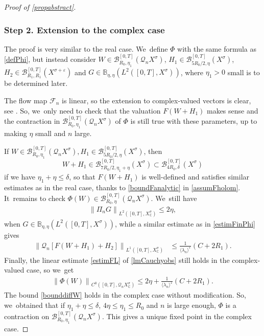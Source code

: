 \documentclass[JEP,XML,SOM,Unicode,published]{cedram}
\theoremstyle{definition}
\let\mc\mathcal
\let\veps\varepsilon
\newcommand{\B}{\mc{B}}
\newcommand{\Q}{\mathcal{Q}}
\providecommand{\inn}[1]{\langle#1\rangle}
\newcommand\nor[2]{\left\|#1\right\|_{#2}}
\newcommand\FL{\mathcal{F}_{n}}
\begin{document}
\begin{proof}[Proof of \cref{propabstract}]
\subsubsection*{Step 2. Extension to the complex case} The proof is very similar to the real case. We~define $\Phi$ with the same formula as \eqref{defPhi}, but instead consider $W\in \B_{R_{0},\eta_{1}}^{[0,T]}(\Q_n X^{\sigma})$, $H_{1}\in \B_{5R_{0}/2,\eta}^{[0,T]}(X^{\sigma})$, $H_{2}\in \B_{R_{1}, R_{1}}^{[0,T]}(X^{\sigma+\veps})$ and $G\in \mathbb{B}_{\eta,\eta}(L^{2}([0,T],X^{\sigma}))$, where $\eta_{1}>0$ small is to be determined later.

The flow map $\FL$ is linear, so the extension to complex-valued vectors is clear, see \cite[Th.\,3]{BS:71-polynomials}. So, we~only need to check that the valuation $F(W+H_{1})$ makes sense and the contraction in $\B_{R_{0},\eta_{1}}^{[0,T]}(\Q_n X^{\sigma})$ of $\Phi$ is still true with these parameters, up to making $\eta$ small and $n$ large.

If $W\in \B_{R_{0},\eta_{1}}^{[0,T]}(\Q_n X^{\sigma}), H_{1}\in \B_{5R_{0}/2,\eta}^{[0,T]}(X^{\sigma})$, then
\[
W+H_{1}\in \B_{7R_{0}/2,\eta_{1}+\eta}^{[0,T]}(X^{\sigma})\subset \B_{4R_{0},\delta}^{[0,T]}(X^{\sigma})
\]
if we have $\eta_{1}+\eta\leq \delta$, so that $F(W+H_{1})$ is well-defined and satisfies similar estimates as in the real case, thanks to \eqref{boundFanalytic} in \cref{assumFholom}. It~remains to check $\Phi(W)\in \B_{R_{0},\eta}^{[0,T]}(\Q_n X^{\sigma})$. We~still have
\begin{align*}
\nor{\Pi_{n}G}{L^{2}([0,T],X_\mathbb{C}^{\sigma})}\leq 2\eta,
\end{align*}
when $G\in \mathbb{B}_{\eta,\eta}(L^{2}([0,T],X^{\sigma}))$, while a similar estimate as in \eqref{estimFinPhi} gives
\begin{align*}
\nor{\Q_{n}\left[ F(W+H_{1})+H_{2}\right]}{L^{1}([0,T],X_\mathbb{C}^{\sigma})}&\leq \frac{1}{\inn{\lambda_n}^{\veps}} \left(C+2R_{1}\right).
\end{align*}
Finally, the linear estimate \eqref{estimFL} of \cref{lmCauchyobs} still holds in the complex-valued case, so we~get
\begin{align*}
\nor{\Phi(W)}{C^{0}([0,T],\Q_{n}X_\mathbb{C}^{\sigma})}\leq 2\eta+ \frac{1}{\inn{\lambda_n}^{\veps}} \left(C+2R_{1}\right).
\end{align*}
The bound \eqref{bounddiffW} holds in the complex case without modification. So, we~obtained that if $\eta_{1}+\eta\leq \delta$, $4\eta\leq \eta_{1}\leq R_{0}$ and $n$ is large enough, $\Phi$ is a contraction on $\B_{R_{0},\eta_{1}}^{[0,T]}(\Q_n X^{\sigma})$. This gives a unique fixed point in the complex case.


\end{proof}
\end{document}
